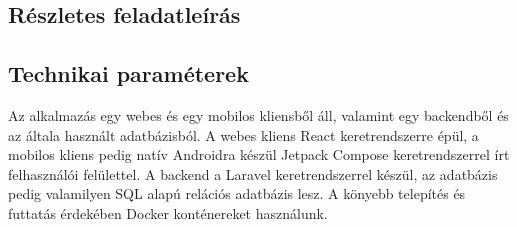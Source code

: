 \subsection{Részletes feladatleírás}


\subsection{Technikai paraméterek}

Az alkalmazás egy webes és egy mobilos kliensből áll, valamint egy backendből és az általa használt adatbázisból. A webes kliens  React keretrendszerre épül, a mobilos kliens pedig natív Androidra készül Jetpack Compose keretrendszerrel írt felhasználói felülettel. A backend a Laravel keretrendszerrel készül, az adatbázis pedig valamilyen SQL alapú relációs adatbázis lesz. A könyebb telepítés és futtatás érdekében Docker konténereket használunk.